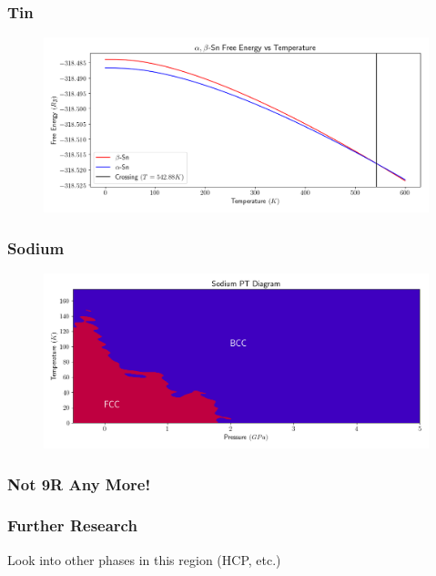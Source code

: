\documentclass{beamer}
\begin{document}
\begin{frame}
	\frametitle{Tin}
	\begin{figure}[ht]
	\begin{center}
	\includegraphics[height=2in]{tin_transition_temperature.png}
	\end{center}
	\end{figure}
\end{frame}

\begin{frame}
	\frametitle{Sodium}
	\begin{figure}[ht]
	\begin{center}
		\includegraphics[height=2in]{sodium_pt_diagram.png}
	\end{center}
	\end{figure}
\end{frame}

\begin{frame}
	\frametitle{Not 9R Any More!}
\end{frame}

\begin{frame}
	\frametitle{Further Research}
	Look into other phases in this region (HCP, etc.)
\end{frame}
\end{document}
